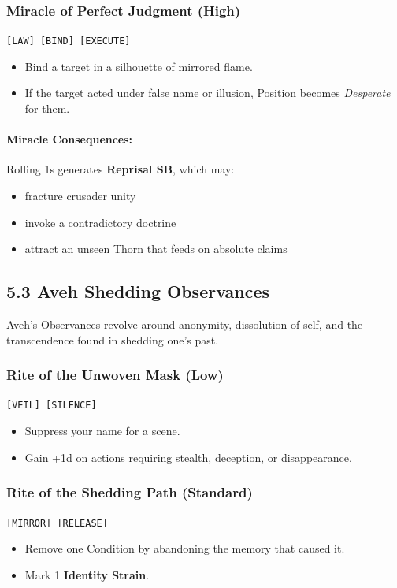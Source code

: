 \documentclass[11pt]{book}
\begin{document}
\subsubsection*{Miracle of Perfect Judgment (High)}
\texttt{[LAW] [BIND] [EXECUTE]}
\begin{itemize}
    \item Bind a target in a silhouette of mirrored flame.
    \item If the target acted under false name or illusion, Position becomes \emph{Desperate} for them.
\end{itemize}

\paragraph{Miracle Consequences:}
Rolling 1s generates \textbf{Reprisal SB}, which may:
\begin{itemize}[leftmargin=*]
    \item fracture crusader unity
    \item invoke a contradictory doctrine
    \item attract an unseen Thorn that feeds on absolute claims
\end{itemize}

\subsection{5.3 Aveh Shedding Observances}

Aveh's Observances revolve around anonymity, dissolution of self, and the transcendence found in shedding one's past.

\subsubsection*{Rite of the Unwoven Mask (Low)}
\texttt{[VEIL] [SILENCE]}
\begin{itemize}
    \item Suppress your name for a scene.
    \item Gain +1d on actions requiring stealth, deception, or disappearance.
\end{itemize}

\subsubsection*{Rite of the Shedding Path (Standard)}
\texttt{[MIRROR] [RELEASE]}
\begin{itemize}
    \item Remove one Condition by abandoning the memory that caused it.
    \item Mark 1 \textbf{Identity Strain}.
\end{itemize}
\end{document}
